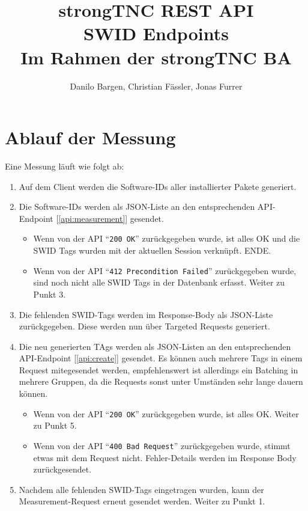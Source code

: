 \documentclass[10pt,a4paper]{scrartcl}
\author{Danilo Bargen, Christian Fässler, Jonas Furrer}
\title{strongTNC REST API\\SWID Endpoints \\ \small{Im Rahmen der strongTNC BA} }
\begin{document}
\begin{titlepage}
	\maketitle
	\vspace{120mm}
	\thispagestyle{empty} %
\end{titlepage}

\newpage
	\tableofcontents
\newpage

\section{Ablauf der Messung}

Eine Messung läuft wie folgt ab:

\begin{enumerate}
	\item Auf dem Client werden die Software-IDs aller installierter Pakete generiert.
	\item Die Software-IDs werden als JSON-Liste an den entsprechenden
		API-Endpoint [\ref{api:measurement}] gesendet.
	\begin{itemize}
		\item Wenn von der API ``\texttt{200 OK}'' zurückgegeben wurde, ist alles OK und die SWID
			Tags wurden mit der aktuellen Session verknüpft. ENDE.
		\item Wenn von der API ``\texttt{412 Precondition Failed}'' zurückgegeben wurde, sind
			noch nicht alle SWID Tags in der Datenbank erfasst. Weiter zu Punkt 3.
	\end{itemize}
	\item Die fehlenden SWID-Tags werden im Response-Body als JSON-Liste
		zurückgegeben. Diese werden nun über Targeted Requests generiert.
	\item Die neu generierten TAgs werden als JSON-Listen an den entsprechenden
		API-Endpoint [\ref{api:create}] gesendet. Es können auch mehrere Tags in
		einem Request mitegesendet werden, empfehlenswert ist allerdings ein
		Batching in mehrere Gruppen, da die Requests sonst unter Umständen sehr
		lange dauern können.
	\begin{itemize}
		\item Wenn von der API ``\texttt{200 OK}'' zurückgegeben wurde, ist alles
			OK. Weiter zu Punkt 5.
		\item Wenn von der API ``\texttt{400 Bad Request}'' zurückgegeben wurde,
			stimmt etwas mit dem Request nicht. Fehler-Details werden im Response Body
			zurückgesendet.
	\end{itemize}
	\item Nachdem alle fehlenden SWID-Tags eingetragen wurden, kann der
		Measurement-Request erneut gesendet werden. Weiter zu Punkt 1.
\end{enumerate}
\end{document}
